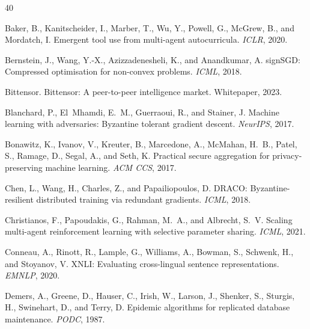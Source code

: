 
\begin{thebibliography}{40}

Baker, B., Kanitscheider, I., Marber, T., Wu, Y., Powell, G., McGrew, B.,
  and Mordatch, I.
\newblock Emergent tool use from multi-agent autocurricula.
\newblock \emph{ICLR}, 2020.

Bernstein, J., Wang, Y.-X., Azizzadenesheli, K., and Anandkumar, A.
\newblock signSGD: Compressed optimisation for non-convex problems.
\newblock \emph{ICML}, 2018.

Bittensor.
\newblock Bittensor: A peer-to-peer intelligence market.
\newblock Whitepaper, 2023.

Blanchard, P., El~Mhamdi, E.~M., Guerraoui, R., and Stainer, J.
\newblock Machine learning with adversaries: Byzantine tolerant gradient
  descent.
\newblock \emph{NeurIPS}, 2017.

Bonawitz, K., Ivanov, V., Kreuter, B., Marcedone, A., McMahan, H.~B.,
  Patel, S., Ramage, D., Segal, A., and Seth, K.
\newblock Practical secure aggregation for privacy-preserving machine learning.
\newblock \emph{ACM CCS}, 2017.

Chen, L., Wang, H., Charles, Z., and Papailiopoulos, D.
\newblock DRACO: Byzantine-resilient distributed training via redundant
  gradients.
\newblock \emph{ICML}, 2018.

Christianos, F., Papoudakis, G., Rahman, M.~A., and Albrecht, S.~V.
\newblock Scaling multi-agent reinforcement learning with selective parameter
  sharing.
\newblock \emph{ICML}, 2021.

Conneau, A., Rinott, R., Lample, G., Williams, A., Bowman, S., Schwenk, H.,
  and Stoyanov, V.
\newblock XNLI: Evaluating cross-lingual sentence representations.
\newblock \emph{EMNLP}, 2020.

Demers, A., Greene, D., Hauser, C., Irish, W., Larson, J., Shenker, S.,
  Sturgis, H., Swinehart, D., and Terry, D.
\newblock Epidemic algorithms for replicated database maintenance.
\newblock \emph{PODC}, 1987.


\end{thebibliography}
